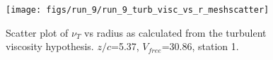 \begin{figure}[H]
\centering
\texttt{[image: figs/run\_9/run\_9\_turb\_visc\_vs\_r\_meshscatter]}
\caption{Scatter plot of $\nu_T$ vs radius as calculated from the turbulent viscosity hypothesis. $z/c$=5.37, $V_{free}$=30.86, station 1.}
\label{fig:run_9_turb_visc_vs_r_meshscatter}
\end{figure}


